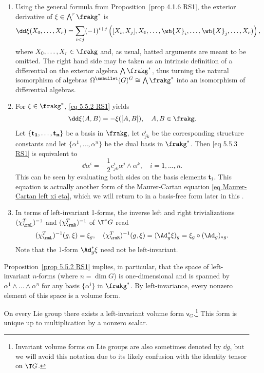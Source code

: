 \begin{rem}
\begin{enumerate}
    \item Using the general formula from Proposition~\ref{prop 4.1.6 RS1}, the exterior derivative of $\xi\in\bigwedge\nolimits^r\frakg^\ast$ is
    \[\dd\xi(X_0,\ldots,X_r)=\sum_{i<j}(-1)^{i+j}\left([X_i,X_j],X_0,\ldots,\wh{X}_i,\ldots,\wh{X}_j,\ldots,X_r)\right),\label{eq 5.5.2 RS1}\]
    where $X_0,\ldots,X_r\in\frakg$ and, as usual, hatted arguments are meant to be omitted. The right hand side may be taken as an intrinsic definition of a differential on the exterior algebra $\bigwedge\frakg^\ast$, thus turning the natural isomorphism of algebras $\Omega^{\smbullet }(G)^G\cong\bigwedge\frakg^\ast$ into an isomorphism of differential algebras.
    \item For $\xi\in\frakg^\ast$, \eqref{eq 5.5.2 RS1} yields
    \[\dd\xi(A,B)=-\xi([A,B]),\quad A,B\in\frakg.\label{eq 5.5.3 RS1}\]
    Let $\{\bf{t}_1,\ldots,\bf{t}_n\}$ be a basis in $\frakg$, let $c^i_{jk}$  be the corresponding structure constants and let $\{\alpha^1,\ldots,\alpha^n\}$ be the dual basis in $\frakg^\ast$. Then \eqref{eq 5.5.3 RS1} is equivalent to
    \[\dd \alpha^i=-\frac 12 c^i_{jk}\alpha^j\wedge \alpha^k,\quad i=1,\ldots,n.\label{eq 5.5.4 RS1 MC in coords}\]
    This can be seen by evaluating both sides on the basis elements $\bf{t}_i$. This equation is actually another form of the Maurer-Cartan equation  \eqref{eq Maurer-Cartan left xi eta}, which we will return to in a basis-free form later in this \sect.
    \item In terms of left-invariant 1-forms, the inverse left and right trivializations $(\chi_\rmL^T)^{-1}$ and $(\chi_\rmR^T)^{-1}$ of $\T^\ast G$ read
    \[(\chi_\rmL^T)^{-1}(g,\xi)=\xi_g,\quad (\chi_\rmR^T)^{-1}(g,\xi)=(\Ad_{g}^\ast \xi)_g=\xi_g\circ (\Ad_g)_{\ast g}.\]
    Note that the 1-form $\Ad_g^\ast\xi$ need not be left-invariant.
\end{enumerate}
\end{rem}

Proposition~\ref{prop 5.5.2 RS1} implies, in particular, that the space of left-invariant $n$-forms (where $n=\dim G$) is one-dimensional and is spanned by $\alpha^1\wedge\ldots\wedge\alpha^n$ for any basis $\{\alpha^i\}$ in $\frakg^\ast$. By left-invariance, every nonzero element of this space is a volume form.

\begin{cor}
    On every Lie group there exists a left-invariant volume form $\mathsf{v}_G$.\footnote{Invariant volume forms on Lie groups are also sometimes denoted by $\dd g$, but we will avoid this notation due to its likely confusion with the identity tensor on $\T G$.} This form is unique up to multiplication by a nonzero scalar. 
\end{cor}

